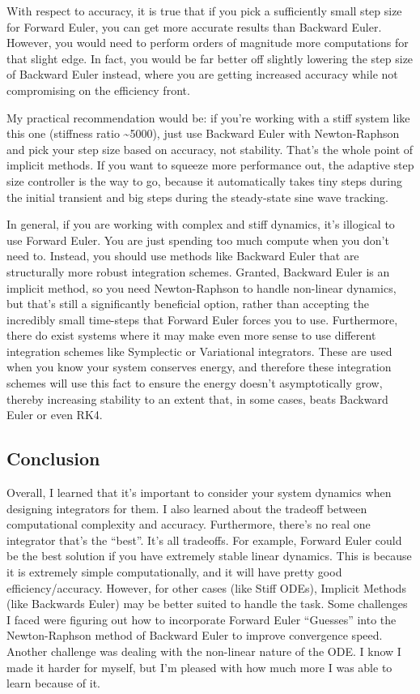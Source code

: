 \documentclass[11pt]{article}
\begin{document}
With respect to accuracy, it is true that if you pick a sufficiently
small step size for Forward Euler, you can get more accurate results
than Backward Euler. However, you would need to perform orders of
magnitude more computations for that slight edge. In fact, you would be
far better off slightly lowering the step size of Backward Euler
instead, where you are getting increased accuracy while not compromising
on the efficiency front.

My practical recommendation would be: if you're working with a stiff
system like this one (stiffness ratio \textasciitilde5000), just use
Backward Euler with Newton-Raphson and pick your step size based on
accuracy, not stability. That's the whole point of implicit methods. If
you want to squeeze more performance out, the adaptive step size
controller is the way to go, because it automatically takes tiny steps
during the initial transient and big steps during the steady-state sine
wave tracking.

In general, if you are working with complex and stiff dynamics, it's
illogical to use Forward Euler. You are just spending too much compute
when you don't need to. Instead, you should use methods like Backward
Euler that are structurally more robust integration schemes. Granted,
Backward Euler is an implicit method, so you need Newton-Raphson to
handle non-linear dynamics, but that's still a significantly beneficial
option, rather than accepting the incredibly small time-steps that
Forward Euler forces you to use. Furthermore, there do exist systems
where it may make even more sense to use different integration schemes
like Symplectic or Variational integrators. These are used when you know
your system conserves energy, and therefore these integration schemes
will use this fact to ensure the energy doesn't asymptotically grow,
thereby increasing stability to an extent that, in some cases, beats
Backward Euler or even RK4.

\subsection{Conclusion}\label{conclusion}

Overall, I learned that it's important to consider your system dynamics
when designing integrators for them. I also learned about the tradeoff
between computational complexity and accuracy. Furthermore, there's no
real one integrator that's the ``best''. It's all tradeoffs. For
example, Forward Euler could be the best solution if you have extremely
stable linear dynamics. This is because it is extremely simple
computationally, and it will have pretty good efficiency/accuracy.
However, for other cases (like Stiff ODEs), Implicit Methods (like
Backwards Euler) may be better suited to handle the task. Some
challenges I faced were figuring out how to incorporate Forward Euler
``Guesses'' into the Newton-Raphson method of Backward Euler to improve
convergence speed. Another challenge was dealing with the non-linear
nature of the ODE. I know I made it harder for myself, but I'm pleased
with how much more I was able to learn because of it.
\end{document}
